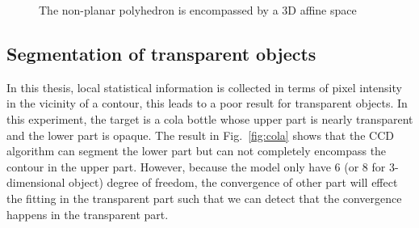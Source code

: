\begin{figure}[htbp]
\begin{minipage}[t]{0.5\linewidth}
  \end{minipage} 
  \begin{minipage}[t]{0.5\linewidth} 
    \centering 
  \end{minipage} 
\caption[Three-dimensional affine shape-space for rigid object]{The
  non-planar polyhedron is encompassed by a 3D affine space}
\label{fig:container}
\end{figure}

\subsection{Segmentation of transparent objects}
\label{sec:sto}
In this thesis, local statistical information is collected in terms of
pixel intensity in the vicinity of a contour, this leads to a poor
result for transparent objects. In this experiment, the
target is a cola bottle whose upper part is nearly transparent and the
lower part is opaque. The result in Fig.~\ref{fig:cola} shows that the CCD algorithm
can segment the lower part but can not completely encompass the contour in the
upper part. However, because the model only have 6 (or 8
for 3-dimensional object) degree of freedom, the convergence of other
part will effect the fitting in the transparent part such that we can
detect that the convergence happens in the transparent part.


